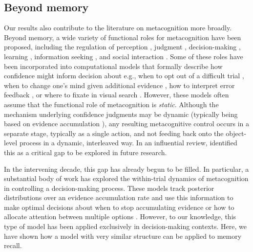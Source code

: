 \subsection{Beyond memory}

Our results also contribute to the literature on metacognition more broadly. Beyond memory, a wide variety of functional roles for metacognition have been proposed, including the regulation of perception \citep{deroy2016metacognition}, judgment \citep{polania2019efficient,lebreton2015automatic}, decision-making \citep{yeung2012metacognition,demartino2013confidence}, learning \citep{fromer2021expectations,nassar2012rational}, information seeking \citep{boldt2019confidence,desender2018subjective}, and social interaction \citep{frith2012role}. Some of these roles have been incorporated into computational models that formally describe how confidence might inform decision about e.g., when to opt out of a difficult trial \citep{kiani2009representation}, when to change one's mind given additional evidence \citep{folke2016explicit}, how to interpret error feedback \citep{fromer2021expectations}, or where to fixate in visual search \citep{stewart2022humans}. However, these models often assume that the functional role of metacognition is \emph{static}. Although the mechanism underlying confidence judgments may be dynamic (typically being based on evidence accumulation \citealp{vickers1970evidence,pleskac2010twostage,moreno-bote2010decision}), any resulting metacognitive control occurs in a separate stage, typically as a single action, and not feeding back onto the object-level process in a dynamic, interleaved way. In an influential review, \citet{yeung2012metacognition} identified this as a critical gap to be explored in future research.

In the intervening decade, this gap has already begun to be filled. In particular, a substantial body of work has explored the within-trial dynamics of metacognition in controlling a decision-making process. These models track posterior distributions over an evidence accumulation rate and use this information to make optimal decisions about when to stop accumulating evidence \citep{drugowitsch2012cost,woodford2014stochastic,bitzer2014perceptual,fudenberg2018speed,tajima2019optimal} or how to allocate attention between multiple options \citep{jang2021optimal,callaway2021fixation}. However, to our knowledge, this type of model has been applied exclusively in decision-making contexts. Here, we have shown how a model with very similar structure can be applied to memory recall. 

